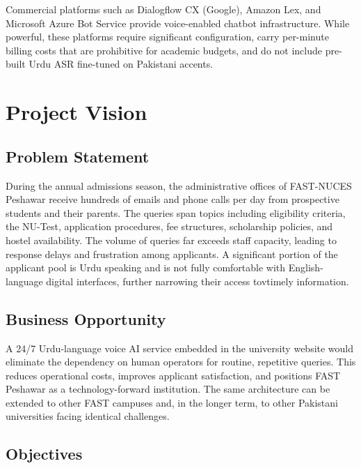 \documentclass[12pt,a4paper]{report}
\begin{document}
Commercial platforms such as Dialogflow CX (Google), Amazon Lex, and Microsoft Azure Bot Service provide voice-enabled chatbot infrastructure. While powerful, these platforms require significant configuration, carry per-minute billing costs that are prohibitive for academic budgets, and do not include pre-built Urdu ASR fine-tuned on Pakistani accents.


\newpage
\section{Project Vision}

\subsection{Problem Statement}

During the annual admissions season, the administrative offices of FAST-NUCES
Peshawar receive hundreds of emails and phone calls per day from prospective
students and their parents. The queries span topics including eligibility
criteria, the NU-Test, application procedures, fee structures, scholarship policies, and hostel availability. The volume of queries far exceeds staff capacity, leading to response delays and frustration among applicants. A significant portion of the applicant pool is Urdu speaking and is not fully comfortable with English-language digital interfaces, further narrowing their access tovtimely information.

\subsection{Business Opportunity}

A 24/7 Urdu-language voice AI service embedded in the university website would eliminate the dependency on human operators for routine, repetitive queries. This reduces operational costs, improves applicant satisfaction, and positions FAST Peshawar as a technology-forward institution. The same architecture can be extended to other FAST campuses and, in the longer term, to other Pakistani universities facing identical challenges.

\subsection{Objectives}
\end{document}
